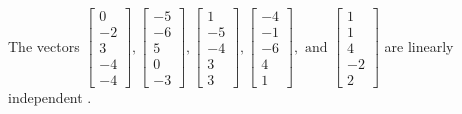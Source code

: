 \begin{exercise}
\begin{exerciseStatement}
  \end{exerciseStatement}
  \begin{exerciseAnswer}
   The vectors \(\left[\begin{array}{r}
0 \\
-2 \\
3 \\
-4 \\
-4
\end{array}\right] , \left[\begin{array}{r}
-5 \\
-6 \\
5 \\
0 \\
-3
\end{array}\right] , \left[\begin{array}{r}
1 \\
-5 \\
-4 \\
3 \\
3
\end{array}\right] , \left[\begin{array}{r}
-4 \\
-1 \\
-6 \\
4 \\
1
\end{array}\right] , \text{ and } \left[\begin{array}{r}
1 \\
1 \\
4 \\
-2 \\
2
\end{array}\right]\) are 
  	 linearly independent  .
  


  \end{exerciseAnswer}
\end{exercise}